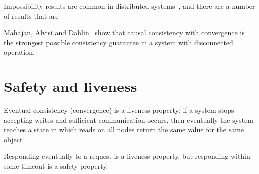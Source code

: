 \documentclass[a4paper,twocolumn,10pt]{article}
\begin{document}
Impossibility results are common in distributed systems~\cite{Lynch1989kj}, and there are a number
of results that are 

\cite{Attiya1995bm}
\cite{Fischer1985tt}

Mahajan, Alvisi and Dahlin~\cite{Mahajan2011wz} show that causal consistency with convergence is the
strongest possible consistency guarantee in a system with disconnected operation.


\section{Safety and liveness}

Eventual consistency (convergence) is a liveness property: if a system stops accepting writes and
sufficient communication occurs, then eventually the system reaches a state in which reads on all
nodes return the same value for the same object~\cite{Mahajan2011wz}.

Responding eventually to a request is a liveness property, but responding within some timeout is a
safety property.

{\footnotesize

{}}
\end{document}
